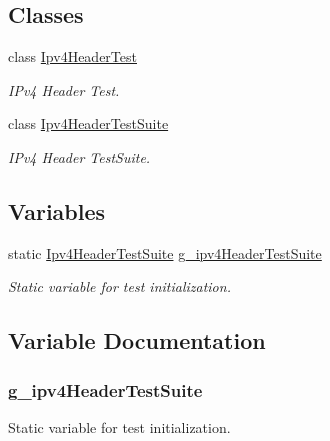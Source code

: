 \subsection*{Classes}
\begin{DoxyCompactItemize}
\item 
class \hyperlink{classIpv4HeaderTest}{Ipv4\+Header\+Test}
\begin{DoxyCompactList}\small\item\em I\+Pv4 Header Test. \end{DoxyCompactList}\item 
class \hyperlink{classIpv4HeaderTestSuite}{Ipv4\+Header\+Test\+Suite}
\begin{DoxyCompactList}\small\item\em I\+Pv4 Header Test\+Suite. \end{DoxyCompactList}\end{DoxyCompactItemize}
\subsection*{Variables}
\begin{DoxyCompactItemize}
\item 
static \hyperlink{classIpv4HeaderTestSuite}{Ipv4\+Header\+Test\+Suite} \hyperlink{ipv4-header-test_8cc_a2eecc7fa4b841e20bf985c059e3db5a7}{g\+\_\+ipv4\+Header\+Test\+Suite}
\begin{DoxyCompactList}\small\item\em Static variable for test initialization. \end{DoxyCompactList}\end{DoxyCompactItemize}


\subsection{Variable Documentation}
\subsubsection[{\texorpdfstring{g\+\_\+ipv4\+Header\+Test\+Suite}{g_ipv4HeaderTestSuite}}]{ g\+\_\+ipv4\+Header\+Test\+Suite\hspace{0.3cm}{\ttfamily [static]}}\hypertarget{ipv4-header-test_8cc_a2eecc7fa4b841e20bf985c059e3db5a7}{}\label{ipv4-header-test_8cc_a2eecc7fa4b841e20bf985c059e3db5a7}


Static variable for test initialization. 

